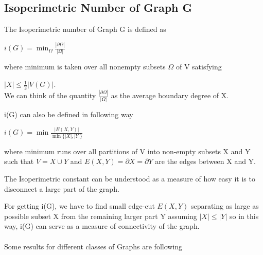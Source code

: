 \documentclass[oneside]{book}
\begin{document}
	
	
	\subsection{Isoperimetric Number of Graph G} \label{ss:23}
	
	
	The Isoperimetric number of Graph G is defined as \par
	\begin{center}
		$i(G)=\min _{\Omega} \frac{|\partial \Omega|}{|\Omega|}$
	\end{center}
	where minimum is taken over all nonempty subsets $\Omega$ of V satisfying\par $|X| \leq \frac{1}{2}|V(G)|$.
	\\           We can think of the quantity  $\frac{|\partial \Omega|}{|\Omega|}$ as the average boundary degree of X. \par
	i(G) can also be defined in following way \par
	\begin{center}
		$i(G)=\min \frac{|E(X, Y)|}{\min \{|X|,|Y|\}}$
	\end{center}
	where minimum runs over all partitions of V into non-empty subsets X and Y such that  $V=X \cup Y$ and $E(X, Y)=\partial X=\partial Y$ are the edges between X and Y.
	\par
	The Isoperimetric constant can be understood as a measure of how easy
	it is to disconnect a large part of the graph. \par
	For getting i(G), we have to find small edge-cut $E(X, Y)$ separating as large as possible subset X from the remaining larger part Y assuming $|X|\leq |Y|$ so in this way, i(G) can serve as a measure of connectivity of the graph. \\\\
	Some results for different classes of Graphs are following \par
\end{document}

